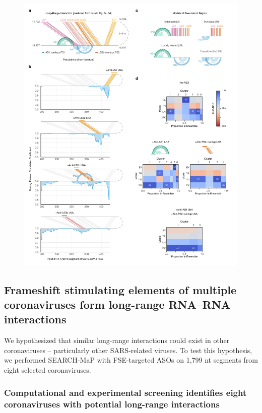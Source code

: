 \documentclass[main.tex]{subfiles}
\begin{document}
\begin{figure}[ht]
	\includegraphics[width=\textwidth]{../MainFigures/lnas/lnas.pdf}
	\caption{}
	\label{lnas}
\end{figure}


\subsection{Frameshift stimulating elements of multiple coronaviruses form long-range RNA--RNA interactions}

We hypothesized that similar long-range interactions could exist in other coronaviruses -- particularly other SARS-related viruses.
To test this hypothesis, we performed SEARCH-MaP with FSE-targeted ASOs on 1,799 nt segments from eight selected coronaviruses.


\subsubsection{Computational and experimental screening identifies eight coronaviruses with potential long-range interactions}
\end{document}
